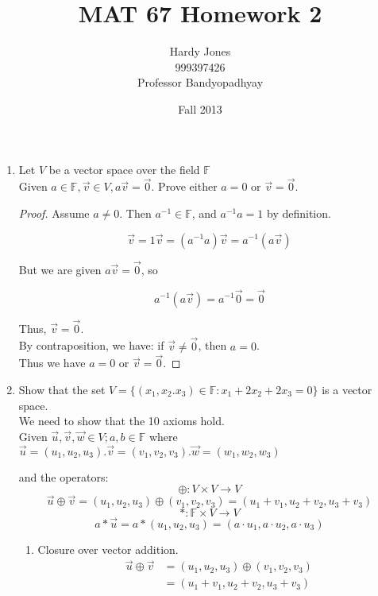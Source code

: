 \documentclass[12pt,letterpaper]{article}
\title{MAT 67 Homework 2\vspace{-2ex}}
\author{Hardy Jones\\
        999397426\\
        Professor Bandyopadhyay\vspace{-2ex}}
\date{Fall 2013}
\begin{document}
  \maketitle

  \begin{enumerate}
    \item Let $V$ be a vector space over the field $\mathbb{F}$ \\
    
      Given $a \in \mathbb{F}, \vec{v} \in V, a\vec{v} = \vec{0}$.
      Prove either $a = 0$ or $\vec{v} = \vec{0}$.
      
      \begin{proof}
        Assume $a \neq 0$.
        Then $a^{-1} \in \mathbb{F}$, and $a^{-1}a = 1$ by definition.
        
        \[\vec{v} = 1\vec{v} = (a^{-1}a)\vec{v} = a^{-1}(a\vec{v})\]
        
        But we are given $a\vec{v} = \vec{0}$, so
        
        \[a^{-1}(a\vec{v}) = a^{-1}\vec{0} = \vec{0}\]
        
        Thus, $\vec{v} = \vec{0}$. \\
        
        By contraposition, we have: if $\vec{v} \neq \vec{0}$, then $a = 0$. \\
        
        Thus we have $a = 0$ or $\vec{v} = \vec{0}$.
      \end{proof}
      
    \item Show that the set $V = \{(x_1, x_2. x_3) \in \mathbb{F} : x_1 + 2x_2 + 2x_3 = 0\}$
    is a vector space. \\
    
       We need to show that the 10 axioms hold. \\
       
       Given $\vec{u}, \vec{v}, \vec{w} \in V; a, b \in \mathbb{F}$
       where $\vec{u} = (u_1, u_2, u_3). \vec{v} = (v_1, v_2, v_3). \vec{w} = (w_1, w_2, w_3)$
       
       and the operators: \\
       \[\oplus: V \times V \to V\]
       \[\vec{u} \oplus \vec{v} = (u_1, u_2, u_3) \oplus (v_1, v_2, v_3) = (u_1 + v_1, u_2 + v_2, u_3 + v_3)\]
       \[*: \mathbb{F} \times V \to V\]
       \[a*\vec{u} = a*(u_1, u_2, u_3) = (a \cdot u_1, a \cdot u_2, a \cdot u_3)\]
       
       \begin{enumerate}
         \item Closure over vector addition.
           \begin{align*}
             \vec{u} \oplus \vec{v} &= (u_1, u_2, u_3) \oplus (v_1, v_2, v_3) \\
             &= (u_1 + v_1, u_2 + v_2, u_3 + v_3)
           \end{align*}
           

\end{enumerate}
\end{enumerate}
\end{document}
